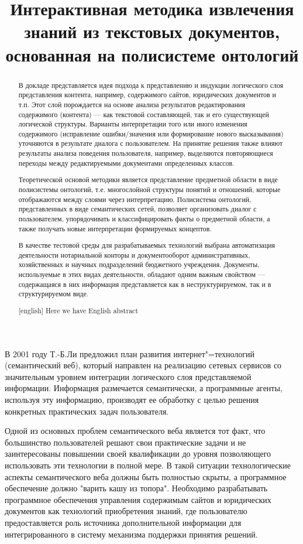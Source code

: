 \documentclass[utf8]{../IncArticle}
\title{Интерактивная методика извлечения\todo[inline]{Первоначальный заголовок: Методика ПРИОБРЕТЕНИЯ знаний из текстовых документов, основанная на анализе ответов пользователя и полисистемы онтологий} знаний из текстовых документов, основанная на полисистеме онтологий}
\date{}
\begin{document}
\begin{abstract}


  В докладе представляется идея подхода к представлению и индукции
  логического слоя представления контента, например, содержимого
  сайтов, юридических документов и т.п. Этот слой порождается на
  основе анализа результатов редактирования содержимого (контента) ---
  как текстовой составляющей, так и его существующей логической
  структуры. Варианты интерпретации того или иного изменения
  содержимого (исправление ошибки/значения или формирование нового
  высказывания) уточняются в результате диалога с пользователем. На
  принятие решения также влияют результаты анализа поведения
  пользователя, например, выделяются повторяющиеся переходы между
  редактируемыми документами определенных классов.

  Теоретической основой методики является представление предметной
  области в виде полисистемы онтологий, т.е. многослойной структуры
  понятий и отношений, которые отображаются между слоями через
  интерпретацию. Полисистема онтологий, представленных в виде
  семантических сетей, позволяет организовать диалог с пользователем,
  упорядочивать и классифицировать факты о предметной области, а также
  получать новые интерпретации формируемых концептов.

  В качестве тестовой среды для разрабатываемых технологий выбрана
  автоматизация деятельности нотариальной конторы и документооборот
  административных, хозяйственных и научных подразделений бюджетного
  учреждения. Документы, используемые в этих видах деятельности,
  обладают одним важным свойством --- содержащаяся в них информация
  представляется как в неструктурируемом, так и в структурируемом
  виде.

\end{abstract}

\begin{abstract}[english]
  Here we have English abstract
\end{abstract}


\introduction{}

В 2001 году Т.-Б.Ли предложил план развития интернет"=технологий
(семантический веб), который направлен на реализацию сетевых сервисов
со значительным уровнем интеграции логического слоя представляемой
информации. Информация размечается семантически, а программные агенты,
используя эту информацию, производят ее обработку с целью решения
конкретных практических задач пользователя.

Одной из основных проблем семантического веба является тот факт, что
большинство пользователей решают свои практические задачи и не
заинтересованы повышении своей квалификации до уровня позволяющего
использовать эти технологии в полной мере. В такой ситуации
технологические аспекты семантического веба должны быть полностью
скрыты, а программное обеспечение должно "варить кашу из
топора". Необходимо разрабатывать программное обеспечения управления
содержимым сайтов и юридических документов как технологий приобретения
знаний, где пользователю предоставляется роль источника дополнительной
информации для интегрированного в систему механизма поддержки принятия
решений.
\end{document}
